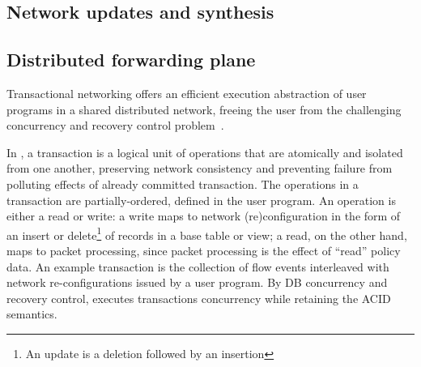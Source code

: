 \vspace{-.5em}
\label{sec:discussion}

\subsection{Network updates and synthesis}



\subsection{Distributed forwarding plane}

Transactional networking offers an efficient execution abstraction of
user programs in a shared distributed network, freeing the user from
the challenging concurrency and recovery control
problem~\cite{consistency-lock,concurrency-recovery-alg,principles-tp,concurrency-ddb,Tc-ddb,crdb}.

 In \Sys, a
transaction is a logical unit of operations that are atomically and
isolated from one another, preserving network consistency and
preventing failure from polluting effects of already committed
transaction. The operations in a transaction are partially-ordered,
defined in the user program. An operation is either a read or write: a
write maps to network (re)configuration in the form of an insert or
delete\footnote{An update is a deletion followed by an insertion} of
records in a base table or view; a read, on the other hand, maps to
packet processing, since packet processing is the effect of ``read''
policy data. An example transaction is the collection of flow events
interleaved with network re-configurations issued by a user
program. By DB concurrency and recovery control, \Sys executes
transactions concurrency while retaining the ACID semantics.

